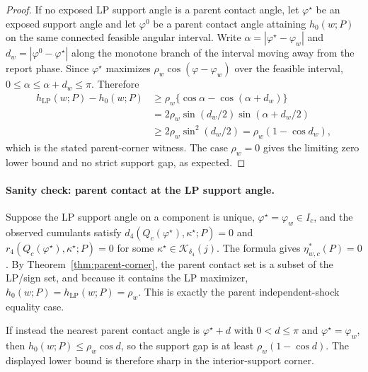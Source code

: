 \begin{proof}
If no exposed LP support angle is a parent contact angle, let \(\varphi^\star\) be an exposed support angle and let \(\varphi^0\) be a parent contact angle attaining \(h_0(w;P)\) on the same connected feasible angular interval.  Write \(\alpha=|\varphi^\star-\varphi_w|\) and \(d_w=|\varphi^0-\varphi^\star|\) along the monotone branch of the interval moving away from the report phase.  Since \(\varphi^\star\) maximizes \(\rho_w\cos(\varphi-\varphi_w)\) over the feasible interval, \(0\le\alpha\le\alpha+d_w\le\pi\).  Therefore
\[
\begin{aligned}
h_{\mathrm{LP}}(w;P)-h_0(w;P)
&\ge \rho_w\{\cos\alpha-\cos(\alpha+d_w)\}\\
&=2\rho_w\sin(d_w/2)\sin(\alpha+d_w/2)\\
&\ge 2\rho_w\sin^2(d_w/2)
=\rho_w(1-\cos d_w),
\end{aligned}
\]
which is the stated parent-corner witness.  The case \(\rho_w=0\) gives the limiting zero lower bound and no strict support gap, as expected.
\end{proof}

\paragraph{Sanity check: parent contact at the LP support angle.}
Suppose the LP support angle on a component is unique, \(\varphi^\star=\varphi_w\in I_c\), and the observed cumulants satisfy \(d_4(Q_c(\varphi^\star),\kappa^\star;P)=0\) and \(r_4(Q_c(\varphi^\star),\kappa^\star;P)=0\) for some \(\kappa^\star\in\mathcal K_{\delta_4}(j)\).  The formula gives \(\eta_{w,c}^*(P)=0\).  By Theorem~\ref{thm:parent-corner}, the parent contact set is a subset of the LP/sign set, and because it contains the LP maximizer, \(h_0(w;P)=h_{\mathrm{LP}}(w;P)=\rho_w\).  This is exactly the parent independent-shock equality case.

If instead the nearest parent contact angle is \(\varphi^\star+d\) with \(0<d\le\pi\) and \(\varphi^\star=\varphi_w\), then \(h_0(w;P)\le\rho_w\cos d\), so the support gap is at least \(\rho_w(1-\cos d)\).  The displayed lower bound is therefore sharp in the interior-support corner.

